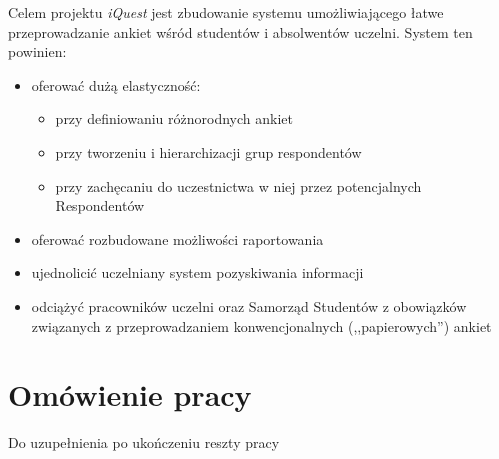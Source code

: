 Celem projektu \textit{iQuest} jest zbudowanie systemu umożliwiającego łatwe przeprowadzanie ankiet wśród studentów i absolwentów uczelni. System ten powinien:
\begin{itemize}
\item{oferować dużą elastyczność:
\begin{itemize}
\item{przy definiowaniu różnorodnych ankiet}
\item{przy tworzeniu i hierarchizacji grup respondentów}
\item{przy zachęcaniu do uczestnictwa w niej przez potencjalnych Respondentów}
\end{itemize}}
\item{oferować rozbudowane możliwości raportowania}
\item{ujednolicić uczelniany system pozyskiwania informacji}
\item{odciążyć pracowników uczelni oraz Samorząd Studentów z obowiązków związanych z przeprowadzaniem konwencjonalnych (,,papierowych'') ankiet}
\end{itemize}

\section{Omówienie pracy}
\label{Chapter14}

{\color{red}Do uzupełnienia po ukończeniu reszty pracy}

